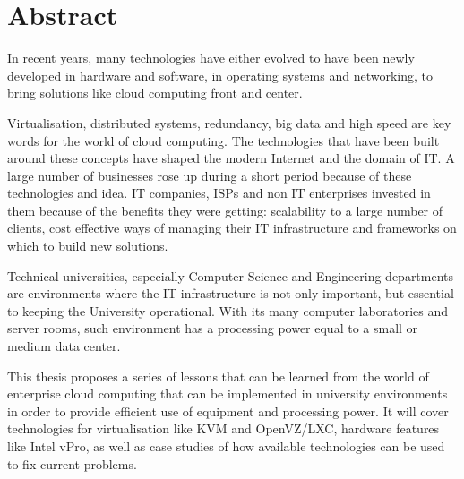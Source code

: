 \begingroup
\let\clearpage\relax
\let\cleardoublepage\relax
\let\cleardoublepage\relax

\chapter*{Abstract}

In recent years, many technologies have either evolved to have been
newly developed in hardware and software, in operating systems and
networking, to bring solutions like cloud computing front and center.


Virtualisation, distributed systems, redundancy, big data and high speed
are key words for the world of cloud computing. The technologies that
have been built around these concepts have shaped the modern Internet
and the domain of IT. A large number of businesses rose up during a short
period because of these technologies and idea. IT companies, ISPs and
non IT enterprises invested in them because of the benefits they were
getting: scalability to a large number of clients, cost effective ways
of managing their IT infrastructure and frameworks on which to build new
solutions.

Technical universities, especially Computer Science and Engineering
departments are environments where the IT infrastructure is not only
important, but essential to keeping the University operational. With its
many computer laboratories and server rooms, such environment has a
processing power  equal to a small or medium data center.

This thesis proposes a series of lessons that can be learned from the
world of enterprise cloud computing that can be implemented in university
environments in order to provide efficient use of equipment and
processing power. It will cover technologies for virtualisation like KVM
and OpenVZ/LXC, hardware features like Intel vPro, as well as case
studies of how available technologies can be used to fix current
problems.


\endgroup

\vfill
